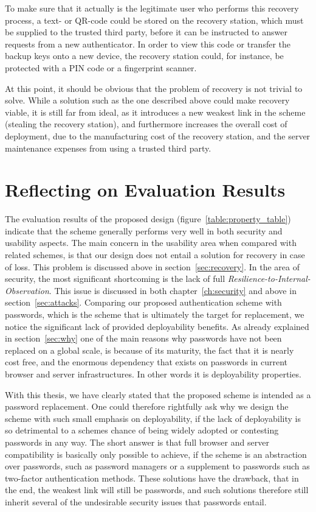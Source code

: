To make sure that it actually is the legitimate user who performs this recovery process, a text- or QR-code could be stored on the recovery station, which must be supplied to the trusted third party, before it can be instructed to answer requests from a new \gls{authenticator}.
In order to view this code or transfer the backup keys onto a new device, the recovery station could, for instance, be protected with a PIN code or a fingerprint scanner. 

At this point, it should be obvious that the problem of recovery is not trivial to solve. While a solution such as the one described above could make recovery viable, it is still far from ideal, as it introduces a new weakest link in the scheme (stealing the recovery station), and furthermore increases the overall cost of deployment, due to the manufacturing cost of the recovery station, and the server maintenance expenses from using a trusted third party.

\section{Reflecting on Evaluation Results}
The evaluation results of the proposed design (figure~\ref{table:property_table}) indicate that the scheme generally performs very well in both security and usability aspects. The main concern in the usability area when compared with related schemes, is that our design does not entail a solution for recovery in case of loss. This problem is discussed above in section~\ref{sec:recovery}. In the area of security, the most significant shortcoming is the lack of full \textit{Resilience-to-Internal-Observation}. This issue is discussed in both chapter~\ref{ch:security} and above in section~\ref{sec:attacks}.
Comparing our proposed authentication scheme with passwords, which is the scheme that is ultimately the target for replacement, we notice the significant lack of provided deployability benefits. As already explained in section~\ref{sec:why} one of the main reasons why passwords have not been replaced on a global scale, is because of its maturity, the fact that it is nearly cost free, and the enormous dependency that exists on passwords in current browser and server infrastructures. In other words it is deployability properties.

With this thesis, we have clearly stated that the proposed scheme is intended as a password replacement. One could therefore rightfully ask why we design the scheme with such small emphasis on deployability, if the lack of deployability is so detrimental to a schemes chance of being widely adopted or contesting passwords in any way. 
The short answer is that full browser and server compatibility is basically only possible to achieve, if the scheme is an abstraction over passwords, such as password managers or a supplement to passwords such as two-factor authentication methods. These solutions have the drawback, that in the end, the weakest link will still be passwords, and such solutions therefore still inherit several of the undesirable security issues that passwords entail. 


